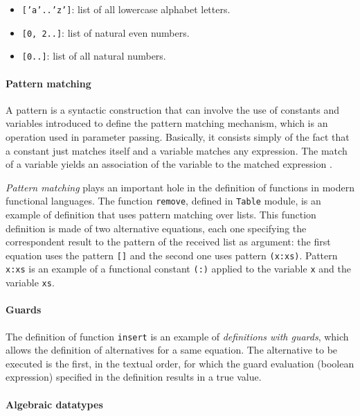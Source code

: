 \documentclass[oneside,12pt]{scrbook}
\theoremstyle{definition}
\theoremstyle{plain}
\theoremstyle{definition}
\begin{document}
\begin{itemize}
	\item{\texttt {['a'..'z']}: list of all lowercase alphabet letters.}
	\item{\texttt {[0, 2..]}: list of natural even numbers.}
	\item{\texttt{[0..]}: list of all natural numbers.}
\end{itemize}

\paragraph{Pattern matching}

A pattern is a syntactic construction that can involve the use of constants and variables introduced to define the pattern matching mechanism, which is an operation used in parameter passing. Basically, it consists simply of the fact that a constant just matches itself and a variable matches any expression. The match of a variable yields an association of the variable to the matched expression .

\textit{Pattern matching} plays an important hole in the definition of functions in modern functional languages. The function \texttt{re\-mo\-ve}, defined in \texttt{Table} module, is an example of definition that uses pattern matching over lists. This function definition is made of two alternative equations, each one specifying the correspondent result to the pattern of the received list as argument: the first equation uses the pattern \texttt{[]} and the second one uses pattern \texttt{(x:xs)}. Pattern \texttt{x:xs} is an example of a functional constant \texttt{(:)} applied to the variable \texttt{x} and the variable \texttt{xs}.


\paragraph{Guards}

The definition of function \texttt{insert} is an example of \emph{definitions with guards}, which allows the definition of alternatives for a same equation. The alternative to be executed is the first, in the textual order, for which the guard evaluation (boolean expression) specified in the definition results in a true value.

\paragraph{Algebraic datatypes}
\end{document}
